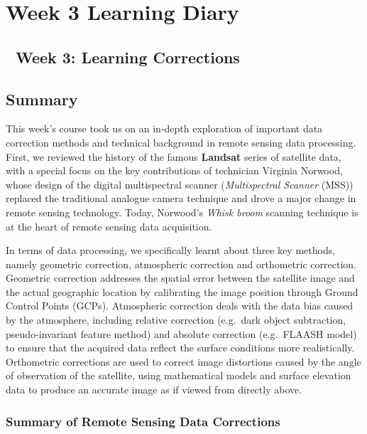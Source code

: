 \documentclass[
  letterpaper,
  DIV=11,
  numbers=noendperiod]{scrreprt}
\begin{document}
\chapter{Week 3 Learning Diary}\label{week-3-learning-diary}

\section{📢 Week 3: Learning
Corrections}\label{week-3-learning-corrections}

\section{Summary}\label{summary-1}

This week's course took us on an in-depth exploration of important data
correction methods and technical background in remote sensing data
processing. First, we reviewed the history of the famous
\textbf{Landsat} series of satellite data, with a special focus on the
key contributions of technician Virginia Norwood, whose design of the
digital multispectral scanner (\emph{Multispectral Scanner} (MSS))
replaced the traditional analogue camera technique and drove a major
change in remote sensing technology. Today, Norwood's \emph{Whisk broom}
scanning technique is at the heart of remote sensing data acquisition.

In terms of data processing, we specifically learnt about three key
methods, namely geometric correction, atmospheric correction and
orthometric correction. Geometric correction addresses the spatial error
between the satellite image and the actual geographic location by
calibrating the image position through Ground Control Points (GCPs).
Atmospheric correction deals with the data bias caused by the
atmosphere, including relative correction (e.g.~dark object subtraction,
pseudo-invariant feature method) and absolute correction (e.g.~FLAASH
model) to ensure that the acquired data reflect the surface conditions
more realistically. Orthometric corrections are used to correct image
distortions caused by the angle of observation of the satellite, using
mathematical models and surface elevation data to produce an accurate
image as if viewed from directly above.

\subsection{Summary of Remote Sensing Data Corrections}
\end{document}
